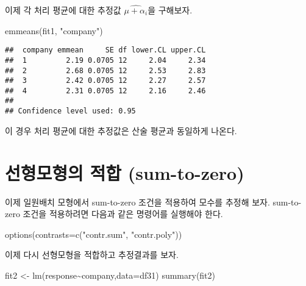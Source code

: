 \documentclass[
]{book}
\newenvironment{Shaded}{\begin{snugshade}}{\end{snugshade}}
\newcommand{\AttributeTok}[1]{\textcolor[rgb]{0.77,0.63,0.00}{#1}}
\newcommand{\FunctionTok}[1]{\textcolor[rgb]{0.00,0.00,0.00}{#1}}
\newcommand{\NormalTok}[1]{#1}
\newcommand{\OtherTok}[1]{\textcolor[rgb]{0.56,0.35,0.01}{#1}}
\newcommand{\SpecialCharTok}[1]{\textcolor[rgb]{0.00,0.00,0.00}{#1}}
\newcommand{\StringTok}[1]{\textcolor[rgb]{0.31,0.60,0.02}{#1}}
\begin{document}
이제 각 처리 평균에 대한 추정값 \(\widehat{\mu+ \alpha_i}\)을 구해보자.

\begin{Shaded}
\begin{Highlighting}[]
\FunctionTok{emmeans}\NormalTok{(fit1, }\StringTok{"company"}\NormalTok{)}
\end{Highlighting}
\end{Shaded}

\begin{verbatim}
##  company emmean     SE df lower.CL upper.CL
##  1         2.19 0.0705 12     2.04     2.34
##  2         2.68 0.0705 12     2.53     2.83
##  3         2.42 0.0705 12     2.27     2.57
##  4         2.31 0.0705 12     2.16     2.46
## 
## Confidence level used: 0.95
\end{verbatim}

이 경우 처리 평균에 대한 추정값은 산술 평균과 동일하게 나온다.

\hypertarget{uxc120uxd615uxbaa8uxd615uxc758-uxc801uxd569-sum-to-zero}{%
\section{선형모형의 적합 (sum-to-zero)}\label{uxc120uxd615uxbaa8uxd615uxc758-uxc801uxd569-sum-to-zero}}

이제 일원배치 모형에서 sum-to-zero 조건을 적용하여 모수를 추정해 보자.
sum-to-zero 조건을 적용하려면 다음과 같은 명령어를 실행해야 한다.

\begin{Shaded}
\begin{Highlighting}[]
\FunctionTok{options}\NormalTok{(}\AttributeTok{contrasts=}\FunctionTok{c}\NormalTok{(}\StringTok{"contr.sum"}\NormalTok{, }\StringTok{"contr.poly"}\NormalTok{))}
\end{Highlighting}
\end{Shaded}

이제 다시 선형모형을 적합하고 추정결과를 보자.

\begin{Shaded}
\begin{Highlighting}[]
\NormalTok{fit2 }\OtherTok{\textless{}{-}} \FunctionTok{lm}\NormalTok{(response}\SpecialCharTok{\textasciitilde{}}\NormalTok{company,}\AttributeTok{data=}\NormalTok{df31)}
\FunctionTok{summary}\NormalTok{(fit2)}
\end{Highlighting}
\end{Shaded}
\end{document}

